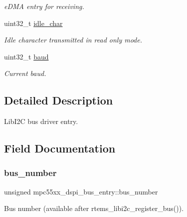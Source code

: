 \begin{DoxyCompactItemize}
\begin{DoxyCompactList}\small\item\em e\+D\+MA entry for receiving. \end{DoxyCompactList}\item 
\mbox{\label{structmpc55xx__dspi__bus__entry_a6cdbcfcfc79199b2b461adff541d9a86}} 
uint32\+\_\+t \mbox{\hyperlink{structmpc55xx__dspi__bus__entry_a6cdbcfcfc79199b2b461adff541d9a86}{idle\+\_\+char}}
\begin{DoxyCompactList}\small\item\em Idle character transmitted in read only mode. \end{DoxyCompactList}\item 
\mbox{\label{structmpc55xx__dspi__bus__entry_a90fa0d885f979ef0312cec1df318db70}} 
uint32\+\_\+t \mbox{\hyperlink{structmpc55xx__dspi__bus__entry_a90fa0d885f979ef0312cec1df318db70}{baud}}
\begin{DoxyCompactList}\small\item\em Current baud. \end{DoxyCompactList}\end{DoxyCompactItemize}


\subsection{Detailed Description}
Lib\+I2C bus driver entry. 

\subsection{Field Documentation}
\mbox{\label{structmpc55xx__dspi__bus__entry_a93dade46628816c971b2c1ca60314e7e}} 
\subsubsection{\texorpdfstring{bus\_number}{bus\_number}}
{\footnotesize\ttfamily unsigned mpc55xx\+\_\+dspi\+\_\+bus\+\_\+entry\+::bus\+\_\+number}



Bus number (available after rtems\+\_\+libi2c\+\_\+register\+\_\+bus()). 

